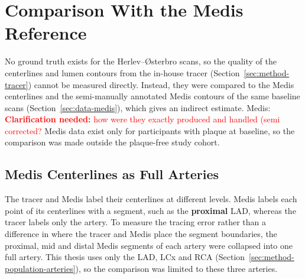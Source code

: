\providecommand{\clarify}[1]{\textcolor{red}{\textbf{Clarification needed:} #1}}
\section{Comparison With the Medis Reference}
\label{sec:method-medis}

No ground truth exists for the Herlev--{\O}sterbro scans, so the quality of the centerlines and lumen contours from the in-house tracer (Section~\ref{sec:method-tracer}) cannot be measured directly.
Instead, they were compared to the Medis centerlines and the semi-manually annotated Medis contours of the same baseline scans (Section~\ref{sec:data-medis}), which gives an indirect estimate.
Medis: \clarify{how were they exactly produced and handled (semi corrected?} 
Medis data exist only for participants with plaque at baseline, so the comparison was made outside the plaque-free study cohort.

\subsection{Medis Centerlines as Full Arteries}
\label{sec:method-medis-arteries}
The tracer and Medis label their centerlines at different levels.
Medis labels each point of its centerlines with a segment, such as the \textbf{proximal} LAD, whereas the tracer labels only the artery.
To measure the tracing error rather than a difference in where the tracer and Medis place the segment boundaries, the proximal, mid and distal Medis segments of each artery were collapsed into one full artery.
This thesis uses only the LAD, LCx and RCA (Section~\ref{sec:method-population-arteries}), so the comparison was limited to these three arteries.

